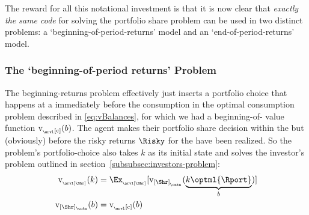 \documentclass[titlepage, headings=optiontotocandhead]{econtex}
\begin{document}
The reward for all this notational investment is that it is now clear that \emph{exactly the same code} for solving the portfolio share problem can be used in two distinct problems: a `beginning-of-period-returns' model and an `end-of-period-returns' model.

\hypertarget{beginning-returns}{}
\subsubsection{The `beginning-of-period returns' Problem}\label{subsubsec:beginning-returns}
The beginning-returns problem effectively just inserts a portfolio choice that happens at a {\stg} immediately before the consumption {\stg} in the optimal consumption problem described in \eqref{eq:vBalances}, for which we had a beginning-of-{\stg} value function $\mathrm{v}_{_\arvl[\mathrm{c}]}(b)$.  The agent makes their portfolio share decision within the {\stg} but (obviously) before the risky returns $\Risky$ for the {\interval} have been realized.  So the problem's portfolio-choice {\stg} also takes $k$ as its initial state and solves the investor's problem outlined in section~\ref{subsubsec:investors-problem}:
\begin{equation}\begin{gathered}\begin{aligned}
  \mathrm{v}_{_\arvl[\Shr]}(k) & = \Ex_{_\arvl[\Shr]}[\mathrm{v}_{[\Shr]_{_\cntn}}(\underbrace{k\optml{\Rport}}_{b})]
\\ \mathrm{v}_{[\Shr]_\cntn}(b)  & = \mathrm{v}_{_\arvl[\mathrm{c}]}(b)
    \end{aligned}\end{gathered}\end{equation}
\end{document}

